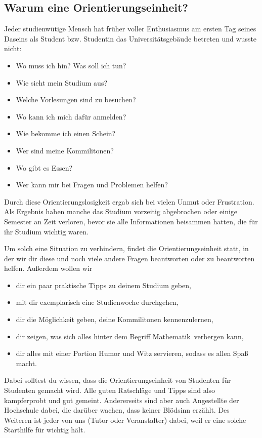 \subsection{Warum eine Orientierungseinheit?}

Jeder studienwütige Mensch hat früher voller Enthusiasmus am ersten Tag seines
Daseins als Student bzw. Studentin das Universitätsgebäude betreten und wusste
nicht: 

\begin{itemize}\itemsep 0pt
    \item Wo muss ich hin? Was soll ich tun? 
    \item Wie sieht mein Studium aus?
    \item Welche Vorlesungen sind zu besuchen?
    \item Wo kann ich mich dafür anmelden?
    \item Wie bekomme ich einen Schein?
    \item Wer sind meine Kommilitonen?
    \item Wo gibt es Essen?
    \item Wer kann mir bei Fragen und Problemen helfen?
\end{itemize}

Durch diese Orientierungslosigkeit ergab sich bei vielen Unmut oder
Frustration. Als Ergebnis haben manche das Studium vorzeitig abgebrochen oder
einige Semester an Zeit verloren, bevor sie alle Informationen beisammen
hatten, die für ihr Studium wichtig waren.

Um solch eine Situation zu verhindern, findet die Orientierungseinheit statt,
in der wir dir diese und noch viele andere Fragen beantworten oder zu
beantworten helfen.  Außerdem wollen wir 

\begin{itemize}\itemsep 0pt
    \item dir ein paar praktische Tipps zu deinem Studium geben,
    \item mit dir exemplarisch eine Studienwoche durchgehen,
    \item dir die Möglichkeit geben, deine Kommi\-litonen kennenzulernen, 
    \item dir zeigen, was sich alles hinter dem Begriff \glqq Mathematik\grqq\
          verbergen kann,
    \item dir alles mit einer Portion Humor und Witz servieren, sodass es allen
          Spaß macht.
\end{itemize}

Dabei solltest du wissen, dass die Orientierungseinheit von Studenten für
Studenten gemacht wird.  Alle guten Ratschläge und Tipps sind also kampferprobt
und gut gemeint.  Andererseits sind aber auch Angestellte der Hochschule dabei,
die darüber wachen, dass keiner Blödsinn erzählt. Des Weiteren ist jeder von
uns (Tutor oder Veranstalter) dabei, weil er eine solche Starthilfe für wichtig
hält.

